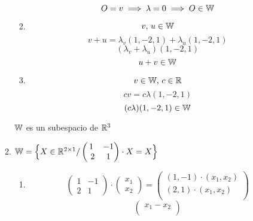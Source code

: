 \documentclass[../practica.root.tex]{subfiles}
\begin{document}
\begin{enumerate}
\begin{enumerate}
\begin{enumerate}
                              \[ O = v \implies \lambda = 0 \implies O \in \mathbb{W} \]
                        \item \[ v\text{, }u \in \mathbb{W} \]
                              \[ v + u = \lambda_v(1,-2,1) + \lambda_u(1,-2,1) \]
                              \[ (\lambda_v + \lambda_u)(1,-2,1) \]
                              \[ u + v \in \mathbb{W} \]
                        \item \[ v \in \mathbb{W}\text{, } c \in \mathbb{R} \]
                              \[ cv = c\lambda(1,-2,1) \]
                              \[ (c\lambda)(1,-2,1) \in \mathbb{W} \]
                    \end{enumerate}
                    $\mathbb{W}$ es un subespacio de $\mathbb{R}^3$
              \item $ \W = \Big\{ X \in \R^{2\x1} /
                        \begin{pmatrix}
                            1 & -1
                            \\ 2 & 1
                        \end{pmatrix}
                        \cdot
                        X = X
                        \Big\} $
                    \begin{enumerate} %
                        \item \[
                                  \begin{pmatrix}
                                      1 & -1 \\
                                      2 & 1
                                  \end{pmatrix}
                                  \cdot
                                  \begin{pmatrix}
                                      x_1 \\ x_2
                                  \end{pmatrix}
                                  =
                                  \begin{pmatrix}
                                      (1,-1)\cdot(x_1,x_2) \\
                                      (2, 1)\cdot(x_1,x_2) \\
                                  \end{pmatrix}
                              \]
                              \[
                                  \begin{pmatrix}
                                      x_1 - x_2 \\

\end{pmatrix}\]
\end{enumerate}
\end{enumerate}
\end{enumerate}
\end{document}
